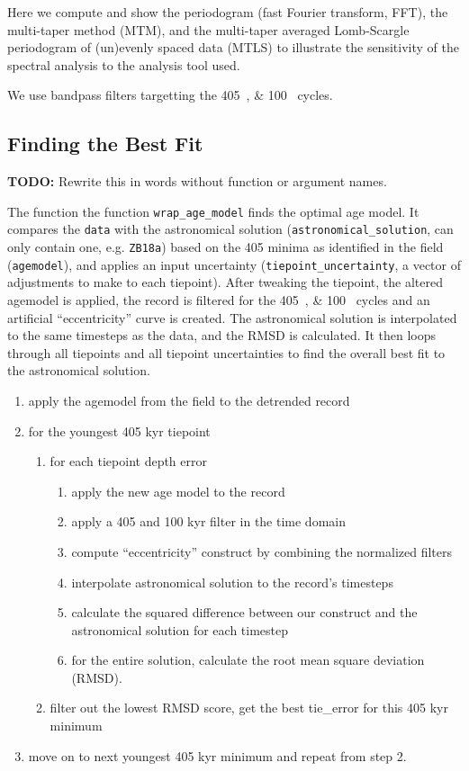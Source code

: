 \documentclass[draft]{agujournal2019}
\begin{document}
Here we compute and show the
periodogram (fast Fourier transform, FFT),
the multi-taper method (MTM),
and
the multi-taper averaged Lomb-Scargle periodogram of (un)evenly spaced data
(MTLS)
to illustrate the sensitivity of the spectral analysis to the analysis tool used.

We use bandpass filters targetting the \qtylist{405;100}{\kiloyear} cycles.

\subsection{Finding the Best Fit}

\textbf{TODO:} Rewrite this in words without function or argument names.

The function the function \texttt{wrap\_age\_model} finds the optimal age
model. It compares the \texttt{data} with the astronomical solution
(\texttt{astronomical\_solution}, can only contain one, e.g. \texttt{ZB18a})
based on the \qty{405}{\kiloyear} minima as identified in the field
(\texttt{agemodel}), and applies an input uncertainty
(\texttt{tiepoint\_uncertainty}, a vector of adjustments to make to each
tiepoint). After tweaking the tiepoint, the altered agemodel is applied, the
record is filtered for the \qtylist{405;100}{\kiloyear} cycles and an
artificial ``eccentricity'' curve is created. The astronomical solution is
interpolated to the same timesteps as the data, and the \gls{RMSD} is
calculated. It then loops through all tiepoints and all tiepoint uncertainties
to find the overall best fit to the astronomical solution.

\begin{enumerate}
\item apply the agemodel from the field to the detrended record
\item for the youngest 405 kyr tiepoint
  \begin{enumerate}
  \item for each tiepoint depth error
    \begin{enumerate}
    \item apply the new age model to the record
    \item apply a 405 and 100 kyr filter in the time domain
    \item compute ``eccentricity'' construct by combining the normalized
      filters
    \item interpolate astronomical solution to the record's timesteps
    \item calculate the squared difference between our construct and the
      astronomical solution for each timestep
    \item for the entire solution, calculate the root mean square deviation (RMSD).
    \end{enumerate}
  \item filter out the lowest RMSD score, get the best tie\_error for this 405
    kyr minimum
  \end{enumerate}
\item move on to next youngest 405 kyr minimum and repeat from step 2.
\end{enumerate}
\end{document}
